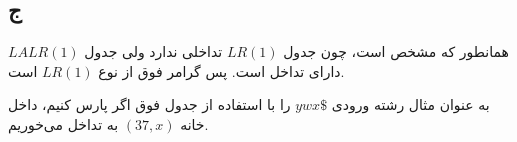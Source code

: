 \subsection*{ج}

همانطور که مشخص است، چون جدول 
$LR(1)$
تداخلی ندارد ولی جدول 
$LALR(1)$
دارای تداخل است. پس گرامر فوق از نوع 
$LR(1)$
است.



به عنوان مثال رشته ورودی 
$ywx\$$
را با استفاده از جدول فوق اگر پارس کنیم، داخل خانه 
$(37,x)$
به تداخل می‌خوریم.















